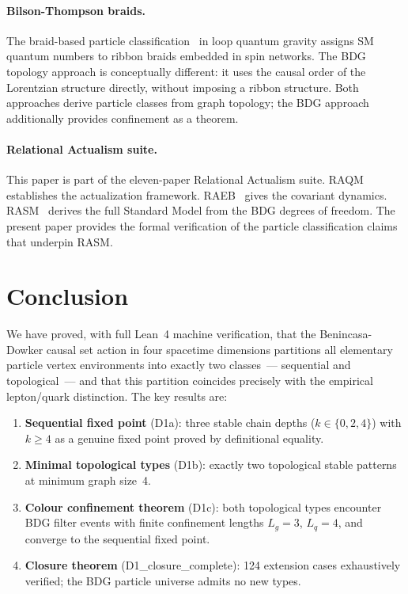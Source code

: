 \documentclass[11pt,a4paper]{article}
\begin{document}
\paragraph{Bilson-Thompson braids.}
The braid-based particle classification~\citep{BilsonThompson2005}
in loop quantum gravity assigns SM quantum numbers to ribbon braids
embedded in spin networks. The BDG topology approach is conceptually
different: it uses the causal order of the Lorentzian structure directly,
without imposing a ribbon structure. Both approaches derive particle
classes from graph topology; the BDG approach additionally provides
confinement as a theorem.

\paragraph{Relational Actualism suite.}
This paper is part of the eleven-paper Relational Actualism suite.
RAQM~\citep{Sandeman2026RAQM} establishes the actualization framework.
RAEB~\citep{Sandeman2026RAEB} gives the covariant dynamics.
RASM~\citep{Sandeman2026RASM} derives the full Standard Model from the
BDG degrees of freedom. The present paper provides the formal
verification of the particle classification claims that underpin RASM.

\section{Conclusion}
\label{sec:conclusion}

We have proved, with full Lean~4 machine verification, that the
Benincasa-Dowker causal set action in four spacetime dimensions
partitions all elementary particle vertex environments into exactly
two classes~--- sequential and topological~--- and that this partition
coincides precisely with the empirical lepton/quark distinction.
The key results are:

\begin{enumerate}
  \item \textbf{Sequential fixed point} (D1a): three stable chain depths
    ($k \in \{0,2,4\}$) with $k \geq 4$ as a genuine fixed point proved
    by definitional equality.
  \item \textbf{Minimal topological types} (D1b): exactly two topological
    stable patterns at minimum graph size~4.
  \item \textbf{Colour confinement theorem} (D1c): both topological types
    encounter BDG filter events with finite confinement lengths $L_g=3$,
    $L_q=4$, and converge to the sequential fixed point.
  \item \textbf{Closure theorem} (D1\_closure\_complete): 124 extension
    cases exhaustively verified; the BDG particle universe admits no new
    types.
\end{enumerate}
\end{document}
